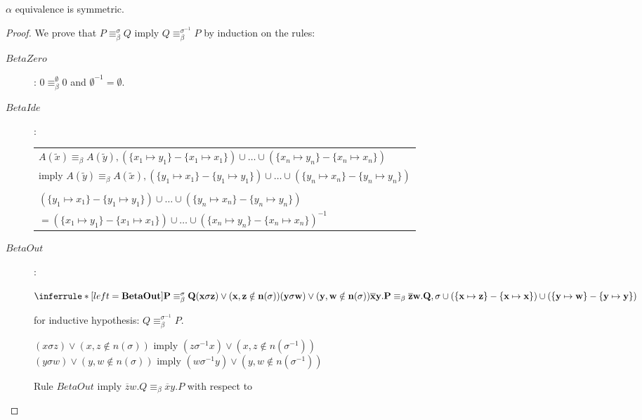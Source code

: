 \begin{lemma}\label{alphaEquivalenceIsSymmetric}
  $\alpha$ equivalence is symmetric.
  \begin{proof}
    We prove that $P\equiv_{\beta}^{\sigma}Q$ imply $Q\equiv_{\beta}^{\sigma^{-1}}P$ by induction on the rules:
    \begin{description}
      \item[$BetaZero$]: 
	$0\equiv_{\beta}^{\emptyset}0$ and $\emptyset^{-1}=\emptyset$.
      \item[$BetaIde$]:
	\begin{center}
	  \begin{tabular}{l}
	    $A(\tilde{x})\equiv_{\beta}A(\tilde{y}), (\{x_{1}\mapsto y_{1}\}-\{x_{1}\mapsto x_{1}\}) \cup \ldots \cup (\{x_{n}\mapsto y_{n}\}-\{x_{n}\mapsto x_{n}\})$ \\ 
	    imply $A(\tilde{y})\equiv_{\beta}A(\tilde{x}), (\{y_{1}\mapsto x_{1}\}-\{y_{1}\mapsto y_{1}\}) \cup \ldots \cup (\{y_{n}\mapsto x_{n}\}-\{y_{n}\mapsto y_{n}\})$ \\\\
	    $(\{y_{1}\mapsto x_{1}\}-\{y_{1}\mapsto y_{1}\}) \cup \ldots \cup (\{y_{n}\mapsto x_{n}\}-\{y_{n}\mapsto y_{n}\})$\\
	    $=(\{x_{1}\mapsto y_{1}\}-\{x_{1}\mapsto x_{1}\}) \cup \ldots \cup (\{x_{n}\mapsto y_{n}\}-\{x_{n}\mapsto x_{n}\})^{-1}$
	  \end{tabular}
	\end{center}
      \item[$BetaOut$]:
	\begin{center}
	  $\inferrule*[left=\bf{BetaOut}]{
	      P\equiv_{\beta}^{\sigma}Q
	    \\
	      (x\sigma z) \vee (x,z\notin n(\sigma))
	    \\
	      (y\sigma w) \vee (y,w\notin n(\sigma))
	  }{
	      \overline{x}y.P\equiv_{\beta}\overline{z}w.Q,
	    \\
	      \sigma \cup (\{x\mapsto z\}-\{x\mapsto x\}) \cup (\{y\mapsto w\}-\{y\mapsto y\})
	  }$
	\end{center}
	for inductive hypothesis: $Q\equiv_{\beta}^{\sigma^{-1}} P$. 
	\begin{center}
	  $(x\sigma z) \vee (x,z\notin n(\sigma))$ imply $(z\sigma^{-1} x) \vee (x,z\notin n(\sigma^{-1}))$\\
	  $(y\sigma w) \vee (y,w\notin n(\sigma))$ imply $(w\sigma^{-1} y) \vee (y,w\notin n(\sigma^{-1}))$
	\end{center}
	Rule $BetaOut$ imply $\overline{z}w.Q\equiv_{\beta}\overline{x}y.P$ with respect to 

\end{description}
\end{proof}
\end{lemma}
